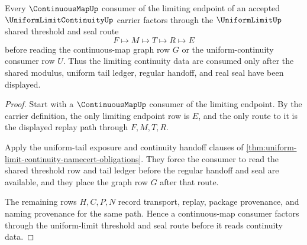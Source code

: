 \begin{theorem}
\label{thm:uniform-limit-continuity-continuousmap-handoff}
Every $\ContinuousMapUp$ consumer of the limiting endpoint of an accepted $\UniformLimitContinuityUp$ carrier factors through the $\UniformLimitUp$ shared threshold and seal route
$$
F \longmapsto M \longmapsto T \longmapsto R \longmapsto E
$$
before reading the continuous-map graph row $G$ or the uniform-continuity consumer row $U$. Thus the limiting continuity data are consumed only after the shared modulus, uniform tail ledger, regular handoff, and real seal have been displayed.
\end{theorem}
\begin{proof}
Start with a $\ContinuousMapUp$ consumer of the limiting endpoint. By the carrier definition, the only limiting endpoint row is $E$, and the only route to it is the displayed replay path through $F,M,T,R$.

Apply the uniform-tail exposure and continuity handoff clauses of \autoref{thm:uniform-limit-continuity-namecert-obligations}. They force the consumer to read the shared threshold row and tail ledger before the regular handoff and seal are available, and they place the graph row $G$ after that route.

The remaining rows $H,C,P,N$ record transport, replay, package provenance, and naming provenance for the same path. Hence a continuous-map consumer factors through the uniform-limit threshold and seal route before it reads continuity data.
\end{proof}

